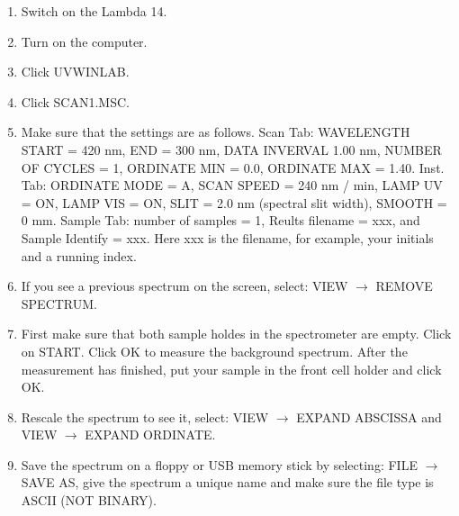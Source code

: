 \documentclass[byrevtex,amssymb,aps,pra,floatfix,letterpaper]{revtex4}
\begin{document}
\begin{enumerate}
\item Switch on the Lambda 14.

\item Turn on the computer.

\item Click UVWINLAB.

\item Click SCAN1.MSC.

\item Make sure that the settings are as follows. Scan Tab: WAVELENGTH START = 420 nm, END = 300 nm, DATA INVERVAL 1.00 nm, NUMBER OF CYCLES = 1, ORDINATE MIN = 0.0, ORDINATE MAX = 1.40. Inst. Tab: ORDINATE MODE = A, SCAN SPEED = 240 nm / min, LAMP UV = ON, LAMP VIS = ON, SLIT = 2.0 nm (spectral slit width), SMOOTH = 0 mm. Sample Tab: number of samples = 1, Reults filename = xxx, and Sample Identify = xxx. Here xxx is the filename, for example, your initials and a running index.


\item If you see a previous spectrum on the screen, select: VIEW $\rightarrow$ REMOVE SPECTRUM.

\item First make sure that both sample holdes in the spectrometer are empty. Click on START. Click OK to measure the background spectrum. After the measurement has finished, put your sample in the front cell holder and click OK.

\item Rescale the spectrum to see it, select: VIEW $\rightarrow$ EXPAND ABSCISSA and VIEW $\rightarrow$ EXPAND ORDINATE.

\item Save the spectrum on a floppy or USB memory stick by selecting: FILE $\rightarrow$ SAVE AS, give the spectrum a unique name and make sure the file type is ASCII (NOT BINARY).

\end{enumerate}
\end{document}
